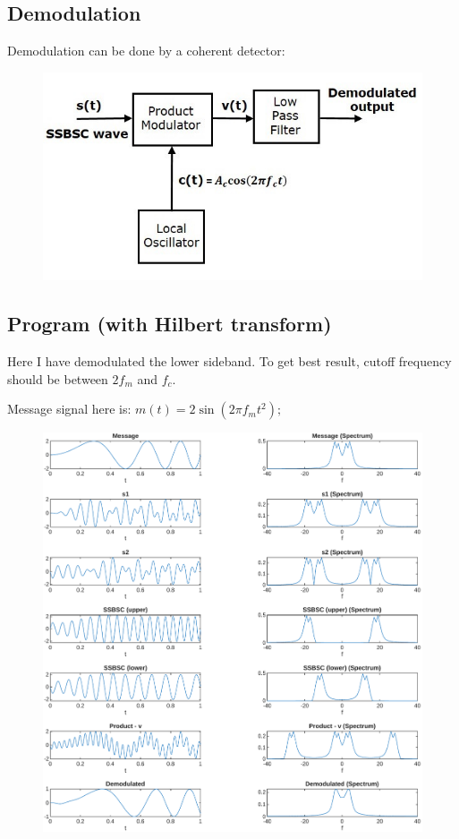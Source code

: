 \subsection{Demodulation}
Demodulation can be done by a coherent detector:
\begin{figure}[H]
	\centering
	\includegraphics[width=.7\textwidth]{img/coh_detec2.jpg}
\end{figure}

\subsection*{Program (with Hilbert transform)}
Here I have demodulated the lower sideband. To get best result, cutoff frequency should be between $2f_m$ and $f_c$.

Message signal here is: $m(t) = 2\sin(2\pi f_m t^2);$

\begin{figure}[H]
	\centering
	\includegraphics[width=\textwidth]{img/ssbsc.pdf}
\end{figure}

\pagebreak